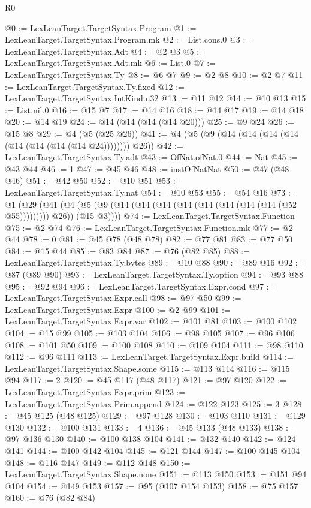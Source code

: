 \begin{lexlean}{R0}
\begin{coremodule}
@0 := LexLeanTarget.TargetSyntax.Program
@1 := LexLeanTarget.TargetSyntax.Program.mk
@2 := List.cons.{0}
@3 := LexLeanTarget.TargetSyntax.Adt
@4 := @2 @3
@5 := LexLeanTarget.TargetSyntax.Adt.mk
@6 := List.{0}
@7 := LexLeanTarget.TargetSyntax.Ty
@8 := @6 @7
@9 := @2 @8
@10 := @2 @7
@11 := LexLeanTarget.TargetSyntax.Ty.fixed
@12 := LexLeanTarget.TargetSyntax.IntKind.u32
@13 := @11 @12
@14 := @10 @13
@15 := List.nil.{0}
@16 := @15 @7
@17 := @14 @16
@18 := @14 @17
@19 := @14 @18
@20 := @14 @19
@24 := @14 (@14 (@14 (@14 @20)))
@25 := @9 @24
@26 := @15 @8
@29 := @4 (@5 (@25 @26))
@41 := @4 (@5 (@9 (@14 (@14 (@14 (@14 (@14 (@14 (@14 (@14 @24)))))))) @26))
@42 := LexLeanTarget.TargetSyntax.Ty.adt
@43 := OfNat.ofNat.{0}
@44 := Nat
@45 := @43 @44
@46 := 1
@47 := @45 @46
@48 := instOfNatNat
@50 := @47 (@48 @46)
@51 := @42 @50
@52 := @10 @51
@53 := LexLeanTarget.TargetSyntax.Ty.nat
@54 := @10 @53
@55 := @54 @16
@73 := @1
    (@29
      (@41 (@4 (@5 (@9 (@14 (@14 (@14 (@14 (@14 (@14 (@14 (@14 (@52 @55))))))))) @26)) (@15 @3))))
@74 := LexLeanTarget.TargetSyntax.Function
@75 := @2 @74
@76 := LexLeanTarget.TargetSyntax.Function.mk
@77 := @2 @44
@78 := 0
@81 := @45 @78 (@48 @78)
@82 := @77 @81
@83 := @77 @50
@84 := @15 @44
@85 := @83 @84
@87 := @76 (@82 @85)
@88 := LexLeanTarget.TargetSyntax.Ty.bytes
@89 := @10 @88
@90 := @89 @16
@92 := @87 (@89 @90)
@93 := LexLeanTarget.TargetSyntax.Ty.option
@94 := @93 @88
@95 := @92 @94
@96 := LexLeanTarget.TargetSyntax.Expr.cond
@97 := LexLeanTarget.TargetSyntax.Expr.call
@98 := @97 @50
@99 := LexLeanTarget.TargetSyntax.Expr
@100 := @2 @99
@101 := LexLeanTarget.TargetSyntax.Expr.var
@102 := @101 @81
@103 := @100 @102
@104 := @15 @99
@105 := @103 @104
@106 := @98 @105
@107 := @96 @106
@108 := @101 @50
@109 := @100 @108
@110 := @109 @104
@111 := @98 @110
@112 := @96 @111
@113 := LexLeanTarget.TargetSyntax.Expr.build
@114 := LexLeanTarget.TargetSyntax.Shape.some
@115 := @113 @114
@116 := @115 @94
@117 := 2
@120 := @45 @117 (@48 @117)
@121 := @97 @120
@122 := LexLeanTarget.TargetSyntax.Expr.prim
@123 := LexLeanTarget.TargetSyntax.Prim.append
@124 := @122 @123
@125 := 3
@128 := @45 @125 (@48 @125)
@129 := @97 @128
@130 := @103 @110
@131 := @129 @130
@132 := @100 @131
@133 := 4
@136 := @45 @133 (@48 @133)
@138 := @97 @136 @130
@140 := @100 @138 @104
@141 := @132 @140
@142 := @124 @141
@144 := @100 @142 @104
@145 := @121 @144
@147 := @100 @145 @104
@148 := @116 @147
@149 := @112 @148
@150 := LexLeanTarget.TargetSyntax.Shape.none
@151 := @113 @150
@153 := @151 @94 @104
@154 := @149 @153
@157 := @95 (@107 @154 @153)
@158 := @75 @157
@160 := @76 (@82 @84)

\end{coremodule}
\end{lexlean}
